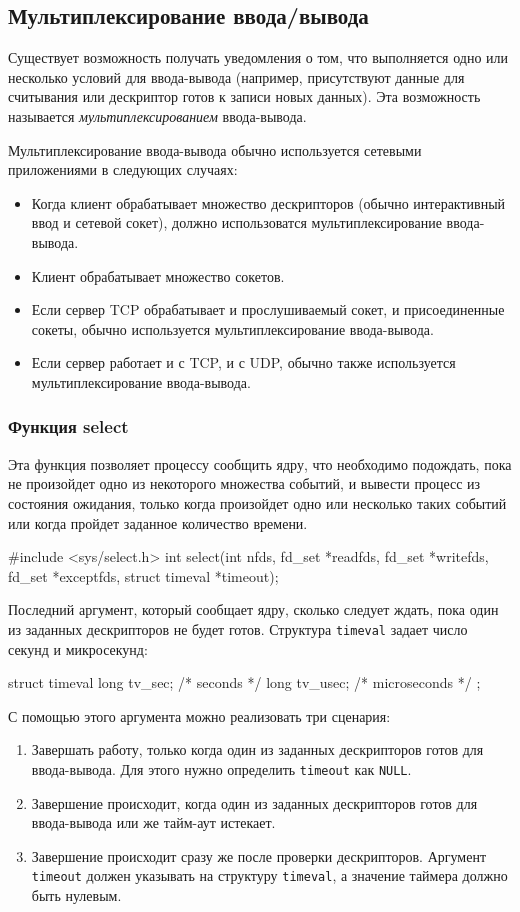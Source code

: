 \subsection{Мультиплексирование ввода/вывода}
Существует возможность получать уведомления о том, что выполняется одно или несколько условий для ввода-вывода (например, присутствуют данные для считывания или дескриптор готов к записи новых данных). Эта возможность называется \emph{мультиплексированием} ввода-вывода.

Мультиплексирование ввода-вывода обычно используется сетевыми приложениями в следующих случаях:
\begin{itemize}
  \item Когда клиент обрабатывает множество дескрипторов (обычно интерактивный ввод и сетевой сокет), должно использоватся мультиплексирование ввода-вывода.
  \item Клиент обрабатывает множество сокетов.
  \item Если сервер TCP обрабатывает и прослушиваемый сокет, и присоединенные сокеты, обычно используется мультиплексирование ввода-вывода.
  \item Если сервер работает и с TCP, и с UDP, обычно также используется мультиплексирование ввода-вывода.
\end{itemize}

\subsubsection{Функция select}
Эта функция позволяет процессу сообщить ядру, что необходимо подождать, пока не произойдет одно из некоторого множества событий, и вывести процесс из состояния ожидания, только когда произойдет одно или несколько таких событий или когда пройдет заданное количество времени.

\begin{clst}{}{}
#include <sys/select.h>
int select(int nfds, fd_set *readfds, fd_set *writefds,
           fd_set *exceptfds, struct timeval *timeout);
\end{clst}

Последний аргумент, который сообщает ядру, сколько следует ждать, пока один из заданных дескрипторов не будет готов. Структура \lstinline{timeval} задает число секунд и микросекунд:
\begin{clst}{}{}
struct timeval {
  long tv_sec;   /* seconds */
  long tv_usec;  /* microseconds */
};
\end{clst}

С помощью этого аргумента можно реализовать три сценария:
\begin{enumerate}
  \item Завершать работу, только когда один из заданных дескрипторов готов для ввода-вывода. Для этого нужно определить \lstinline{timeout} как \lstinline{NULL}.
  \item Завершение происходит, когда один из заданных дескрипторов готов для ввода-вывода или же тайм-аут истекает.
  \item Завершение происходит сразу же после проверки дескрипторов. Аргумент \lstinline{timeout} должен указывать на структуру \lstinline{timeval}, а значение таймера должно быть нулевым.
\end{enumerate}

